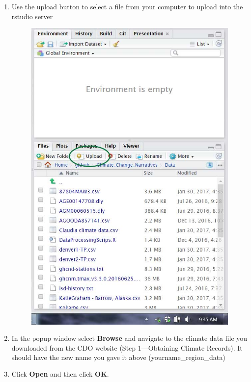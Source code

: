 \documentclass{article}\usepackage[]{graphicx}\usepackage[]{color}
\begin{document}
  \begin{enumerate}
  \item Use the upload button to select a file from your computer to upload into the rstudio server
  \begin{figure}[h]
  \includegraphics[scale=0.25]{"../Admin/graphics/Upload_button"}
  \end{figure}
  \item In the popup window select \textbf{Browse} and navigate to the climate data file you downloaded from the CDO website (Step 1---Obtaining Climate Records). It should have the new name you gave it above (yourname\_region\_data)
  \item Click \textbf{Open} and then click \textbf{OK}. 
  
  \end{enumerate}
\end{document}
